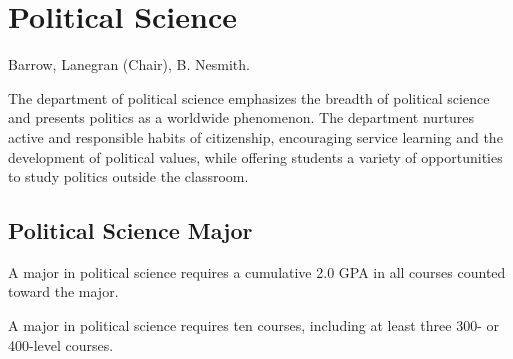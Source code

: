 \documentclass[
  letterpaper,
]{scrbook}
\begin{document}
\section{Political Science}\label{political-science}

Barrow, Lanegran (Chair), B. Nesmith.

The department of political science emphasizes the breadth of political
science and presents politics as a worldwide phenomenon. The department
nurtures active and responsible habits of citizenship, encouraging
service learning and the development of political values, while offering
students a variety of opportunities to study politics outside the
classroom.

\subsection{Political Science Major}\label{political-science-major}

A major in political science requires a cumulative 2.0 GPA in all
courses counted toward the major.

A major in political science requires ten courses, including at least
three 300- or 400-level courses.
\end{document}
